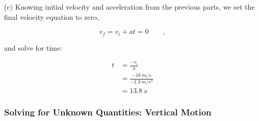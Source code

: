 \documentclass[]{exam}
\theoremstyle{definition}
\begin{document}
\begin{questions}
\begin{solution}
    (c) Knowing initial velocity and acceleration from the previous parts, we set the final velocity equation to zero,

    \begin{equation*}
        v_f = v_i + a t = 0 \qquad ,
    \end{equation*}

    and solve for time:

    \begin{align*}
        t &= \frac{-v_i}{a} \\[1ex]
        &= \frac{-\SI{18}{m/s}}{\SI{-1.3}{m/s^2}} \\[1ex]
        &= \boxed{\SI{13.8}{s}}
    \end{align*}
\end{solution}


\end{questions}

\clearpage

\subsubsection*{Solving for Unknown Quantities: Vertical Motion}
\end{document}
